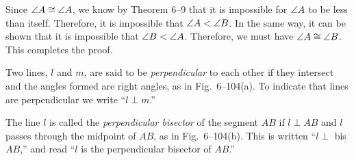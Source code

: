 \documentclass[11pt]{book}
\begin{document}
Since $\angle A \cong \angle A$, we know by Theorem 6--9 that it is impossible
for $\angle A$ to be less than itself. Therefore, it is impossible that $\angle A
< \angle B$. In the same way, it can be shown that it is impossible that
$\angle B < \angle A$. Therefore, we must have $\angle A \cong \angle B$. This
completes the proof.

\begin{definition}
Two lines, $l$ and $m$, are said to be \emph{perpendicular} to each other if
they intersect and the angles formed are right angles, as in Fig.~6--104(a).
To indicate that lines are perpendicular we write ``$l \perp m$.''
\end{definition}

\FIGVIONEHUNDREDFOUR

The line $l$ is called the \emph{perpendicular bisector} of the segment $AB$ if
$l \perp AB$ and $l$ passes through the midpoint of $AB$, as in
Fig.~6--104(b). This is written ``$l \perp$ bis $AB$,'' and read ``$l$ is the
perpendicular bisector of $AB$.''
\end{document}
